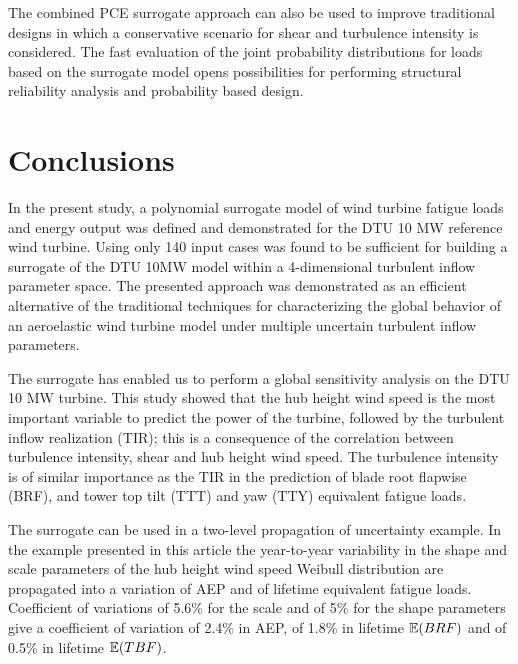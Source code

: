 \documentclass[preprint,12pt]{elsarticle}
\begin{document}
The combined PCE surrogate approach can also be used to improve traditional designs in which a conservative scenario for shear and turbulence intensity is considered. The fast evaluation of the joint probability distributions for loads based on the surrogate model opens possibilities for performing structural reliability analysis and probability based design.

\section{Conclusions}

In the present study, a polynomial surrogate model of wind turbine fatigue loads and energy output was defined and demonstrated for the DTU 10 MW reference wind turbine. Using only 140 input cases was found to be sufficient for building a surrogate of the DTU 10MW model within a 4-dimensional turbulent inflow parameter space. The presented approach was demonstrated as an efficient alternative of the traditional techniques for characterizing the global behavior of an aeroelastic wind turbine model under multiple uncertain turbulent inflow parameters. 

The surrogate has enabled us to perform a global sensitivity analysis on the DTU 10 MW turbine. This study showed that the hub height wind speed is the most important variable to predict the power of the turbine, followed by the turbulent inflow realization (TIR); this is a consequence of the correlation between turbulence intensity, shear and hub height wind speed. The turbulence intensity is of similar  importance as the TIR in the prediction of blade root flapwise  (BRF), and tower top tilt (TTT) and yaw (TTY) equivalent fatigue loads. 

The surrogate can be used in a two-level propagation of uncertainty example. In the example presented in this article the year-to-year variability in the shape and scale parameters of the hub height wind speed Weibull distribution are propagated into a variation of AEP and of lifetime equivalent fatigue loads.  Coefficient of variations of 5.6\% for the scale and of 5\% for the shape parameters give a coefficient of variation of 2.4\% in AEP, of 1.8\% in lifetime $\mathbb{E}(BRF)$ and of 0.5\% in lifetime $\mathbb{E}(TBF)$. 

 
\end{document}

